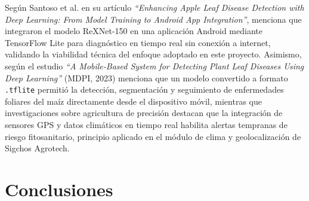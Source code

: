 \documentclass[12pt,a4paper]{article}
\begin{document}
Según Santoso et al. en su artículo \textit{``Enhancing Apple Leaf Disease
Detection with Deep Learning: From Model Training to Android App
Integration''}, menciona que integraron el modelo ReXNet-150 en una aplicación
Android mediante TensorFlow Lite para diagnóstico en tiempo real sin conexión a
internet, validando la viabilidad técnica del enfoque adoptado en este
proyecto. Asimismo, según el estudio \textit{``A Mobile-Based System for
Detecting Plant Leaf Diseases Using Deep Learning''} (MDPI, 2023) menciona que
un modelo convertido a formato \texttt{.tflite} permitió la detección,
segmentación y seguimiento de enfermedades foliares del maíz directamente
desde el dispositivo móvil, mientras que investigaciones sobre agricultura de
precisión destacan que la integración de sensores GPS y datos climáticos en
tiempo real habilita alertas tempranas de riesgo fitosanitario, principio
aplicado en el módulo de clima y geolocalización de Sigchos Agrotech.

\section{Conclusiones}
\end{document}
